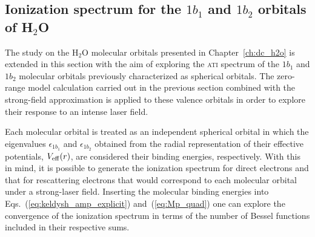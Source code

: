 \subsection{\label{sec:mo_sfa} Ionization spectrum for the $1b_{1}$ and $1b_{2}$ orbitals
  of H$_{2}$O}



The study on the H$_{2}$O molecular orbitals presented in
Chapter~\ref{ch:dc_h2o} is extended in this section with the aim of
exploring the \textsc{ati} spectrum of the $1b_{1}$ and $1b_{2}$
molecular orbitals previously characterized as spherical orbitals. The
zero-range model calculation carried out in the previous section
combined with the strong-field approximation is applied to these
valence orbitals in order to explore their response to an intense
laser field.


Each molecular orbital is treated as an independent spherical orbital
in which the eigenvalues $\epsilon_{1b_{1}}$ and $\epsilon_{1b_{2}}$
obtained from the radial representation of their effective potentials,
$V_{\rm{eff}}(r)$, are considered their binding energies,
respectively. With this in mind, it is possible to generate the
ionization spectrum for direct electrons and that for rescattering
electrons that would correspond to each molecular orbital under a
strong-laser field. Inserting the molecular binding energies into
Eqs.~(\ref{eq:keldysh_amp_explicit}) and~(\ref{eq:Mp_quad}) one can
explore the convergence of the ionization spectrum in terms of the
number of Bessel functions included in their respective sums.

